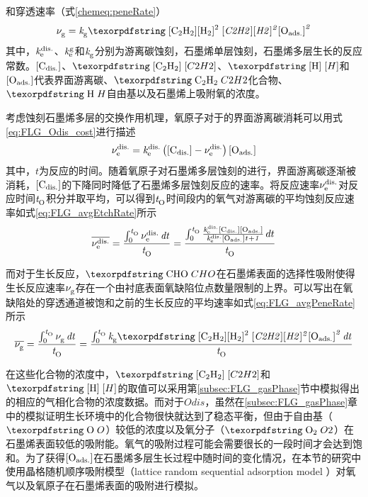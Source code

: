 和穿透速率（式\eqref{chemeq:peneRate}）\chinesecolon
\begin{equation}
    \label{chemeq:peneRate}
    \RateV{g}{}=\RateK{g}{}\cemb{[C2H2][H2]^2}\Oads^2
\end{equation}
其中，$\it{k_{\rm e}^{\rm dis.}} \it$、$\it{k_{\rm e}^{\rm g}} \it$和$\it{k_{\rm g}^{\rm }} \it$分别为游离碳蚀刻，石墨烯单层蚀刻，石墨烯多层生长的反应常数。$\rm{\left[C_{dis.}\right]} \it$、$\cemb{[C2H2]}$、$\cemb{[H]}$和$\rm{\left[O_{ads.}\right]} \it$代表界面游离碳、$\cemb{C2H2}$化合物、$\cemb{H}$自由基以及石墨烯上吸附氧的浓度。

考虑蚀刻石墨烯多层的交换作用机理，氧原子对于的界面游离碳消耗可以用式\eqref{eq:FLG_Odis_cost}进行描述\chinesecolon
\begin{equation}
    \label{eq:FLG_Odis_cost}
    \it \nu_{\rm e}^{\rm dis.} \it=\it{k_{\rm e}^{\rm dis.}} \it\left(\rm{\left[C_{dis.}\right]} \it-\it \nu_{\rm e}^{\rm dis.} \it\right)\rm{\left[O_{ads.}\right]} \it
\end{equation}
其中，$t$为反应的时间。随着氧原子对石墨烯多层蚀刻的进行，界面游离碳逐渐被消耗，$\rm{\left[C_{dis.}\right]} \it$的下降同时降低了石墨烯多层蚀刻反应的速率。将反应速率$\it \nu_{\rm e}^{\rm dis.} \it$对反应时间$\it{t_{\rm O}^{\rm }} \it$积分并取平均，可以得到$\it{t_{\rm O}^{\rm }} \it$时间段内的氧气对游离碳的平均蚀刻反应速率如式\eqref{eq:FLG_avgEtchRate}所示\chinesecolon
\begin{equation}
    \label{eq:FLG_avgEtchRate}
    \overline{\it \nu_{\rm e}^{\rm dis.} \it}=\frac{\int_{0}^{\it{t_{\rm O}^{\rm }} \it} \it \nu_{\rm e}^{\rm dis.} \it \,dt }{\it{t_{\rm O}^{\rm }} \it}=\frac{\int_{0}^{\it{t_{\rm O}^{\rm }} \it} \frac{\it{k_{\rm e}^{\rm dis.}} \it\rm{\left[C_{dis.}\right]} \it\rm{\left[O_{ads.}\right]} \it}{\it{k_{\rm e}^{\rm dis.}} \it\rm{\left[O_{ads.}\right]} \it \it{t_{\rm }^{\rm }} \it + 1} \,dt}{\it{t_{\rm O}^{\rm }} \it}
\end{equation}

而对于生长反应，$\cemb{CHO}$在石墨烯表面的选择性吸附使得生长反应速率$\it \nu_{\rm g}^{\rm } \it$存在一个由衬底表面氧缺陷位点数量限制的上界。可以写出在氧缺陷处的穿透通道被饱和之前的生长反应的平均速率如式\eqref{eq:FLG_avgPeneRate}所示\chinesecolon
\begin{equation}
    \label{eq:FLG_avgPeneRate}
    \overline{\RateV{g}{}}=\frac{\int_{0}^{\ReactTime{O}{}} \RateV{g}{} \,dt }{\ReactTime{O}{}}= \frac{\int_{0}^{\ReactTime{O}{}} \RateK{g}{}\cemb{[C2H2][H2]^2}\Oads^2 \,dt }{\ReactTime{O}{}}
\end{equation}

在这些化合物的浓度中，$\cemb{[C2H2]}$和$\cemb{[H]}$的取值可以采用第\ref{subsec:FLG_gasPhase}节中模拟得出的相应的气相化合物的浓度数据。而对于$Odis$，虽然在\ref{subsec:FLG_gasPhase}章中的模拟证明生长环境中的化合物很快就达到了稳态平衡，但由于自由基（$\cemb{O}$）较低的浓度以及氧分子（$\cemb{O2}$）在石墨烯表面较低的吸附能。氧气的吸附过程可能会需要很长的一段时间才会达到饱和。为了获得$\rm{\left[O_{ads.}\right]} \it$在石墨烯多层生长过程中随时间的变化情况，在本节的研究中使用晶格随机顺序吸附模型（lattice random sequential adsorption model ）对氧气以及氧原子在石墨烯表面的吸附进行模拟。

